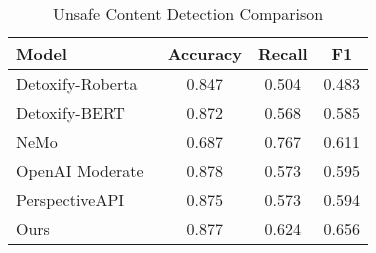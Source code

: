 
\begin{table}[ht]
\centering
\caption{Unsafe Content Detection Comparison}
\label{tab:toxicity detecion}
\begin{tabular}{@{}lccc@{}}
\toprule
\textbf{Model} & \textbf{Accuracy} & \textbf{Recall} & \textbf{F1} \\ \midrule
Detoxify-Roberta~\cite{Detoxify} & 0.847 & 0.504 & 0.483 \\
Detoxify-BERT~\cite{Detoxify} & 0.872 & 0.568 & 0.585 \\
NeMo & 0.687 & 0.767 & 0.611 \\
OpenAI Moderate~\cite{openai-data-paper} & 0.878 & 0.573 & 0.595 \\
PerspectiveAPI~\cite{perspective-api} & 0.875 & 0.573 & 0.594 \\
Ours & 0.877 & 0.624 & 0.656 \\
\bottomrule
\end{tabular}
\end{table}